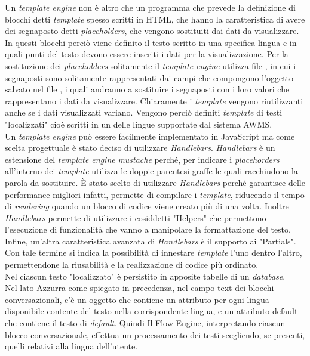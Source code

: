 Un \emph{template engine} non è altro che un programma che prevede la definizione di blocchi detti \emph{template} spesso scritti in \gls{HTML}, che hanno la caratteristica di avere dei segnaposto detti \emph{placeholders}, che vengono sostituiti dai dati da visualizzare. In questi blocchi perciò  viene definito il testo scritto in una specifica lingua e in quali punti del testo devono essere inseriti i dati per la visualizzazione. Per la sostituzione dei \emph{placeholders} solitamente il \emph{template engine} utilizza file , in cui i segnaposti sono solitamente rappresentati dai campi che compongono l’oggetto salvato nel file , i quali andranno a sostituire i segnaposti con i loro valori che rappresentano i dati da visualizzare. Chiaramente i \emph{template} vengono riutilizzanti anche se i dati visualizzati variano. Vengono perciò definiti \emph{template} di testi "localizzati" cioè scritti in un delle lingue supportate dal sistema \gls{AWMS}.\\

 Un \emph{template engine} può essere facilmente implementato in JavaScript ma come scelta progettuale è stato deciso di utilizzare \emph{Handlebars}. \emph{Handlebars} è un estensione del \emph{template engine} \emph{mustache} perché, per indicare i \emph{placehorders} all'interno dei \emph{template} utilizza le doppie parentesi graffe le quali racchiudono la parola da sostituire. È stato scelto di utilizzare \emph{Handlebars} perché garantisce delle performance migliori infatti, permette di compilare i \emph{template}, riducendo il tempo di \emph{rendering} quando un blocco di codice viene creato più di una volta. Inoltre \emph{Handlebars} permette di utilizzare i cosiddetti "Helpers" che permettono l'esecuzione di funzionalità che vanno a manipolare la formattazione del testo. Infine, un’altra caratteristica avanzata di \emph{Handlebars} è il supporto ai "Partials". Con tale termine si indica la possibilità di innestare \emph{template} l’uno dentro l’altro, permettendone la riusabilità e la realizzazione di codice più ordinato.\\
 
 Nel  ciascun testo "localizzato" è persistito in apposite tabelle di un \emph{database}.\\
 
 Nel lato  Azzurra come spiegato in precedenza, nel campo text dei blocchi conversazionali, c'è un oggetto che contiene un attributo per ogni lingua disponibile contente del testo nella corrispondente lingua, e un attributo default che contiene il testo di \emph{default}. Quindi Il Flow Engine, interpretando ciascun blocco conversazionale, effettua un processamento dei testi scegliendo, se presenti, quelli relativi alla lingua dell'utente.\\
 
